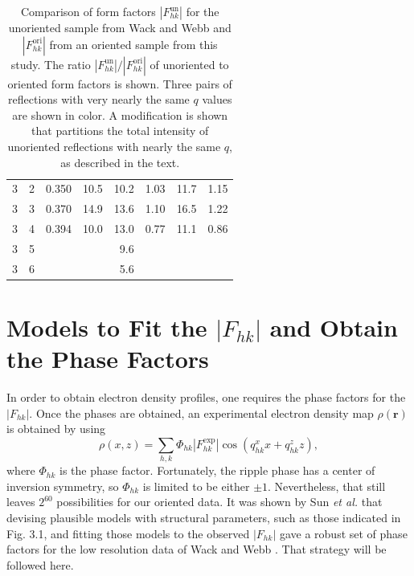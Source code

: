 \begin{table}[htbp]
\begin{tabular}{rrrrrrrr}
    3 &  2 & 0.350                & 10.5  & 10.2  & 1.03 & 11.7  & 1.15 \\
    3 &  3 & 0.370                & 14.9  & 13.6  & 1.10 & 16.5  & 1.22 \\
    3 &  4 & 0.394                & 10.0  & 13.0  & 0.77 & 11.1  & 0.86 \\
    3 &  5 &                      &       & 9.6   &                     \\
    3 &  6 &                      &       & 5.6   &                     \\
    \hline
  \end{tabular}
  \caption[Comparison of form factors $\left|F_{hk}^\text{un}\right|$ for the 
  unoriented sample from Wack and Webb \cite{ref:Wack89} and 
  $\left|F_{hk}^\text{ori}\right|$ from an oriented sample from this study]
  {Comparison of form factors $\left|F_{hk}^\text{un}\right|$ for the 
  unoriented sample from Wack and Webb \cite{ref:Wack89} and 
  $\left|F_{hk}^\text{ori}\right|$ from an oriented sample from this study. 
  The ratio $\left|F_{hk}^\text{un}\right|/\left|F_{hk}^\text{ori}\right|$ of 
  unoriented to oriented form factors is shown.  Three pairs of reflections 
  with very nearly the same $q$ values are shown in color.  A modification is 
  shown that partitions the total intensity of unoriented reflections with 
  nearly the same $q$, as described in the text.}
  \label{tab:cmu_vs_wack}
\end{table}

\newpage
\section{Models to Fit the $|F_{hk}|$ and Obtain the Phase Factors}\label{sec:LAXS_models}
In order to obtain electron density profiles, one requires the phase factors 
for the $|F_{hk}|$.  
Once the phases are obtained, an experimental electron density map 
$\rho(\mathbf{r})$ is obtained
by using
\begin{equation}
  \rho(x,z) = \sum_{h,k} \Phi_{hk} \left|F_{hk}^\text{exp}\right| \cos(q_{hk}^xx+q_{hk}^zz),
  \label{eq:Fourier_reconstruction}
\end{equation}
where $\Phi_{hk}$ is the phase factor.  
Fortunately, the ripple phase has a center of inversion symmetry, so 
$\Phi_{hk}$ is limited to be either $\pm 1$. Nevertheless, that still 
leaves $2^{60}$ possibilities for our oriented data.  
It was shown by Sun \textit{et al.} \cite{ref:Sun96} that devising plausible 
models with structural parameters, such as those indicated in Fig. 3.1, and 
fitting those models to the observed $|F_{hk}|$ gave a robust set of phase 
factors for the low resolution data of Wack and Webb \cite{ref:Wack89}.  
That strategy will be followed here.

